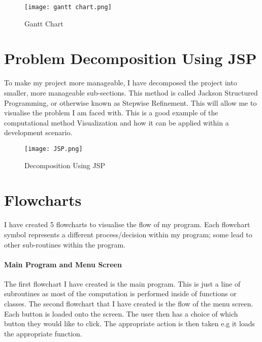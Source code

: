 \documentclass[12pt]{report}
\begin{document}
\begin{figure}[h]
    \centering
    \texttt{[image: gantt chart.png]}
    \caption{Gantt Chart}
    \label{gantChart}
\end{figure}

\section{Problem Decomposition Using JSP}
To make my project more manageable, I have decomposed the project into smaller, more manageable sub-sections. This method is called Jackson Structured Programming, or otherwise known as Stepwise Refinement. This will allow me to visualise the problem I am faced with. This is a good example of the computational method Visualization and how it can be applied within a development scenario.

\begin{figure}[h]
    \centering
    \texttt{[image: JSP.png]}
    \caption{Decomposition Using JSP}
    \label{JSPmodel}
\end{figure}

\pagebreak

\section{Flowcharts}
I have created 5 flowcharts to visualise the flow of my program. Each flowchart symbol represents a different process/decision within my program; some lead to other sub-routines within the program.

\paragraph{Main Program and Menu Screen}
 The first flowchart I have created is the main program. This is just a line of subroutines as most of the computation is performed inside of functions or classes. The second flowchart that I have created is the flow of the menu screen. Each button is loaded onto the screen. The user then has a choice of which button they would like to click. The appropriate action is then taken e.g it loads the appropriate function. 
\end{document}
